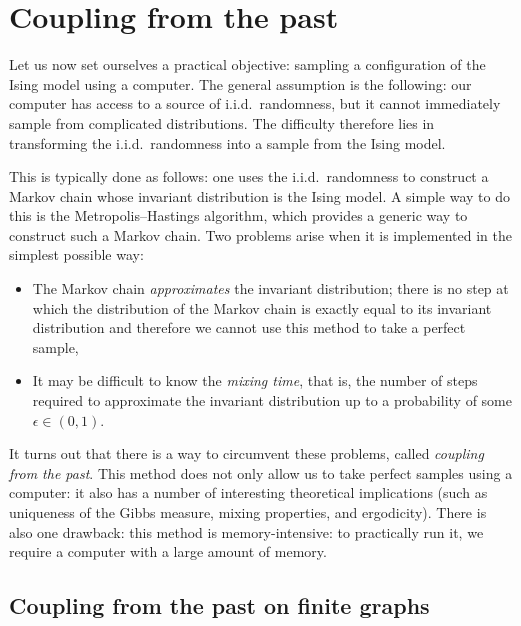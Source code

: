 \section{Coupling from the past}

Let us now set ourselves a practical objective:
sampling a configuration of the Ising model using a computer.
The general assumption is the following:
our computer has access to a source of i.i.d.\ randomness,
but it cannot immediately sample from complicated distributions.
The difficulty therefore lies in transforming the i.i.d.\ randomness
into a sample from the Ising model.

This is typically done as follows: one uses the i.i.d.\ randomness
to construct a Markov chain whose invariant distribution is the Ising model.
A simple way to do this is the Metropolis--Hastings algorithm,
which provides a generic way to construct such a Markov chain.
Two problems arise when it is implemented in the simplest possible way:
\begin{itemize}
    \item The Markov chain \emph{approximates} the invariant distribution; there is no step at which the 
    distribution of the Markov chain is exactly equal to its invariant distribution
    and therefore we cannot use this method to take a perfect sample,
    \item It may be difficult to know the \emph{mixing time}, that is,
    the number of steps required to approximate the invariant distribution
    up to a probability of some $\epsilon\in(0,1)$.
\end{itemize}
It turns out that there is a way to circumvent these problems,
called \emph{coupling from the past}.
This method does not only allow us to take perfect samples using a computer:
it also has a number of interesting theoretical implications
(such as uniqueness of the Gibbs measure, mixing properties, and ergodicity).
There is also one drawback: this method is memory-intensive:
to practically run it, we require a computer with a large amount of memory.

\subsection{Coupling from the past on finite graphs}

